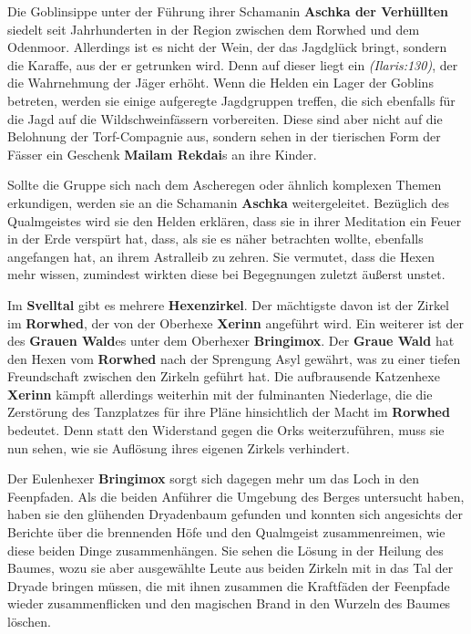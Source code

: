 \newpage

Die Goblinsippe unter der Führung ihrer Schamanin \textbf{Aschka der Verhüllten} siedelt seit Jahrhunderten in der Region zwischen dem Rorwhed und dem Odenmoor.
Allerdings ist es nicht der Wein, der das Jagdglück bringt, sondern die Karaffe, aus der er getrunken wird.
Denn auf dieser liegt ein   \emph{(Ilaris:130)}, der die Wahrnehmung der Jäger erhöht.
Wenn die Helden ein Lager der Goblins betreten, werden sie einige aufgeregte Jagdgruppen treffen, die sich ebenfalls für die Jagd auf die Wildschweinfässern vorbereiten.
Diese sind aber nicht auf die Belohnung der Torf-Compagnie aus, sondern sehen in der tierischen Form der Fässer ein Geschenk \textbf{Mailam Rekdai}s an ihre Kinder.

Sollte die Gruppe sich nach dem Ascheregen oder ähnlich komplexen Themen erkundigen, werden sie an die Schamanin \textbf{Aschka} weitergeleitet.
Bezüglich des Qualmgeistes wird sie den Helden erklären, dass sie in ihrer Meditation ein Feuer in der Erde verspürt hat, dass, als sie es näher betrachten wollte, ebenfalls angefangen hat, an ihrem Astralleib zu zehren.
Sie vermutet, dass die Hexen mehr wissen, zumindest wirkten diese bei Begegnungen zuletzt äußerst unstet.


\neuespalte

Im \textbf{Svelltal} gibt es mehrere \textbf{Hexenzirkel}. Der mächtigste davon ist der Zirkel im \textbf{Rorwhed}, der von der Oberhexe \textbf{Xerinn} angeführt wird.
Ein weiterer ist der des \textbf{Grauen Wald}es unter dem Oberhexer \textbf{Bringimox}.
Der \textbf{Graue Wald} hat den Hexen vom \textbf{Rorwhed} nach der Sprengung Asyl gewährt, was zu einer tiefen Freundschaft zwischen den Zirkeln geführt hat.
Die aufbrausende Katzenhexe \textbf{Xerinn} kämpft allerdings weiterhin mit der fulminanten Niederlage, die die Zerstörung des Tanzplatzes für ihre Pläne hinsichtlich der Macht im \textbf{Rorwhed} bedeutet.
Denn statt den Widerstand gegen die Orks weiterzuführen, muss sie nun sehen, wie sie Auflösung ihres eigenen Zirkels verhindert.

Der Eulenhexer \textbf{Bringimox} sorgt sich dagegen mehr um das Loch in den Feenpfaden.
Als die beiden Anführer die Umgebung des Berges untersucht haben, haben sie den glühenden Dryadenbaum gefunden und konnten sich angesichts der Berichte über die brennenden Höfe und den Qualmgeist zusammenreimen, wie diese beiden Dinge zusammenhängen.
Sie sehen die Lösung in der Heilung des Baumes, wozu sie aber ausgewählte Leute aus beiden Zirkeln mit in das Tal der Dryade bringen müssen, die mit ihnen zusammen die Kraftfäden der Feenpfade wieder zusammenflicken und den magischen Brand in den Wurzeln des Baumes löschen.

